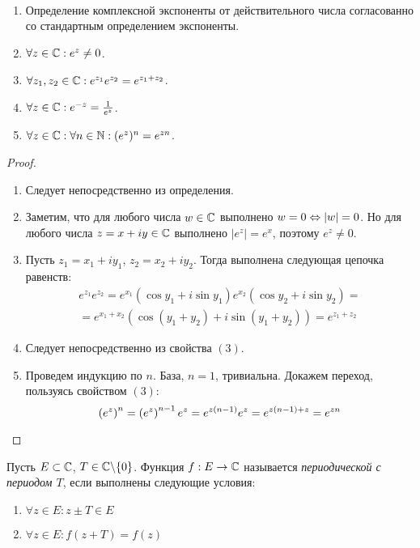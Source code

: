 \begin{proposition}~
	\begin{enumerate}
		\item Определение комплексной экспоненты от действительного числа согласованно со стандартным определением экспоненты.
		\item $\forall z \in \mathbb{C}: e^z \ne 0$.
		\item $\forall z_1, z_2 \in \mathbb{C}: e^{z_1}e^{z_2} = e^{z_1 + z_2}$.
		\item $\forall z \in \mathbb{C}: e^{-z} = \frac{1}{e^z}$.
		\item $\forall z \in \mathbb{C}: \forall n \in \mathbb{N}: (e^{z})^n = e^{zn}$.
	\end{enumerate}
\end{proposition}

\begin{proof}~
	\begin{enumerate}
		\item Следует непосредственно из определения.
		\item Заметим, что для любого числа $w \in \mathbb{C}$ выполнено $w = 0 \Leftrightarrow |w| = 0$. Но для любого числа $z = x + iy \in \mathbb{C}$ выполнено $|e^z| = e^x$, поэтому $e^z \ne 0$.
		\item Пусть $z_1 = x_1 + iy_1$, $z_2 = x_2 + iy_2$. Тогда выполнена следующая цепочка равенств:
		\begin{multline*}
			e^{z_1}e^{z_2} = e^{x_1}(\cos{y_1} + i\sin{y_1})e^{x_2}(\cos{y_2} + i\sin{y_2}) = \\
			= e^{x_1 + x_2}(\cos(y_1 + y_2) + i\sin(y_1 + y_2)) = e^{z_1 + z_2}
		\end{multline*}
		\item Следует непосредственно из свойства $(3)$.
		\item Проведем индукцию по $n$. База, $n = 1$, тривиальна. Докажем переход, пользуясь свойством $(3)$:
		\[\left(e^z\right)^n = \left(e^z\right)^{n-1}e^z = e^{z(n-1)}e^z = e^{z(n-1) + z} = e^{zn}\qedhere\]
	\end{enumerate}
\end{proof}

\begin{definition}
	Пусть $E \subset \mathbb{C}$, $T \in \mathbb{C} \backslash \{0\}$. Функция $f : E \to \mathbb{C}$ называется \textit{периодической с периодом $T$}, если выполнены следующие условия:
	\begin{enumerate}
		\item $\forall z \in E: z \pm T \in E$
		\item $\forall z \in E: f(z + T) = f(z)$
	\end{enumerate}
\end{definition}


